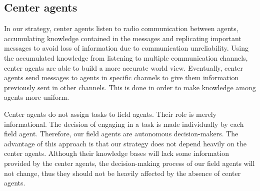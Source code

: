 \subsection{Center agents}
\label{sec:center}
In our strategy, center agents listen to radio communication between agents, accumulating knowledge contained in the messages and replicating important messages to avoid loss of information due to communication unreliability. Using the accumulated knowledge from listening to multiple communication channels, center agents are able to build a more accurate world view. Eventually, center agents send messages to agents in specific channels to give them information previously sent in other channels. This is done in order to make knowledge among agents more uniform.

Center agents do not assign tasks to field agents. Their role is merely informational. The decision of engaging in a task is made individually by each field agent. Therefore, our field agents are autonomous decision-makers. The advantage of this approach is that our strategy does not depend heavily on the center agents. Although their knowledge bases will lack some information provided by the center agents, the decision-making process of our field agents will not change, thus they should not be heavily affected by the absence of center agents.


